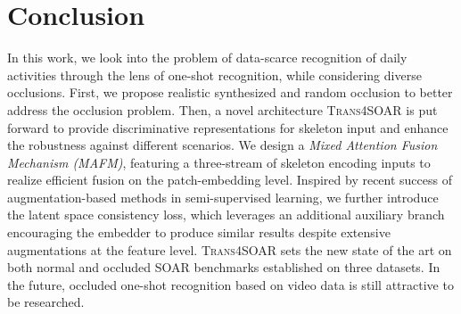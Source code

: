 \documentclass[lettersize,journal]{IEEEtran}
\begin{document}
\section{Conclusion}
In this work, we look into the problem of data-scarce recognition of daily activities through the lens of one-shot recognition, while considering diverse occlusions.
First, we propose realistic synthesized and random occlusion to better address the occlusion problem.
Then, a novel architecture \textsc{Trans4SOAR} is put forward to provide discriminative representations for skeleton input and enhance the robustness against different scenarios.
We design a \emph{Mixed Attention Fusion Mechanism (MAFM)}, featuring a three-stream of skeleton encoding inputs to realize efficient fusion on the patch-embedding level.
Inspired by recent success of augmentation-based methods in semi-supervised learning, we further introduce the latent space consistency loss, which leverages an additional auxiliary branch encouraging the embedder to produce similar results despite extensive augmentations at the feature level.
\textsc{Trans4SOAR} sets the new state of the art on both normal and occluded SOAR benchmarks established on three datasets. In the future, occluded one-shot recognition based on video data is still attractive to be researched. 


\end{document}
